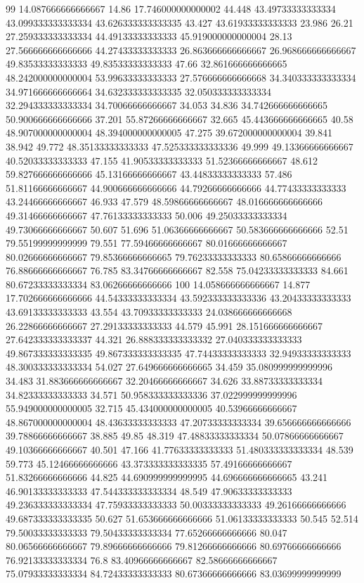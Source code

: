 99 14.087666666666667 14.86 17.746000000000002 44.448 43.49733333333334 43.099333333333334 43.626333333333335 43.427 43.61933333333333 23.986 26.21 27.259333333333334 44.49133333333333 45.919000000000004 28.13 27.566666666666666 44.27433333333333 26.863666666666667 26.968666666666667 49.83533333333333 49.83533333333333 47.66 32.861666666666665 48.242000000000004 53.99633333333333 27.576666666666668 34.340333333333334 34.971666666666664 34.632333333333335 32.050333333333334 32.294333333333334 34.70066666666667 34.053 34.836 34.742666666666665 50.900666666666666 37.201 55.87266666666667 32.665 45.443666666666665 40.58 48.907000000000004 48.394000000000005 47.275 39.672000000000004 39.841 38.942 49.772 48.35133333333333 47.525333333333336 49.999 49.13366666666667 40.52033333333333 47.155 41.90533333333333 51.52366666666667 48.612 59.827666666666666 45.13166666666667 43.44833333333333 57.486 51.81166666666667 44.900666666666666 44.79266666666666 44.77433333333333 43.24466666666667 46.933 47.579 48.59866666666667 48.016666666666666 49.31466666666667 47.76133333333333 50.006 49.25033333333334 49.73066666666667 50.607 51.696 51.06366666666667 50.583666666666666 52.51 79.55199999999999 79.551 77.59466666666667 80.01666666666667 80.02666666666667 79.85366666666665 79.76233333333333 80.65866666666666 76.88666666666667 76.785 83.34766666666667 82.558 75.04233333333333 84.661 80.67233333333334 83.06266666666666
100 14.058666666666667 14.877 17.702666666666666 44.54333333333334 43.592333333333336 43.20433333333333 43.69133333333333 43.554 43.70933333333333 24.038666666666668 26.22866666666667 27.29133333333333 44.579 45.991 28.151666666666667 27.642333333333337 44.321 26.888333333333332 27.040333333333333 49.867333333333335 49.867333333333335 47.74433333333333 32.94933333333333 48.300333333333334 54.027 27.649666666666665 34.459 35.080999999999996 34.483 31.883666666666667 32.20466666666667 34.626 33.88733333333334 34.82333333333333 34.571 50.958333333333336 37.022999999999996 55.949000000000005 32.715 45.434000000000005 40.53966666666667 48.867000000000004 48.43633333333333 47.20733333333334 39.656666666666666 39.78866666666667 38.885 49.85 48.319 47.48833333333334 50.07866666666667 49.10366666666667 40.501 47.166 41.77633333333333 51.480333333333334 48.539 59.773 45.12466666666666 43.373333333333335 57.49166666666667 51.83266666666666 44.825 44.690999999999995 44.696666666666665 43.241 46.90133333333333 47.544333333333334 48.549 47.90633333333333 49.236333333333334 47.75933333333333 50.00333333333333 49.26166666666666 49.687333333333335 50.627 51.653666666666666 51.06133333333333 50.545 52.514 79.50033333333333 79.50433333333334 77.65266666666666 80.047 80.06566666666667 79.89666666666666 79.81266666666666 80.69766666666666 76.92133333333334 76.8 83.40966666666667 82.58666666666667 75.07933333333334 84.72433333333333 80.67366666666666 83.03699999999999
